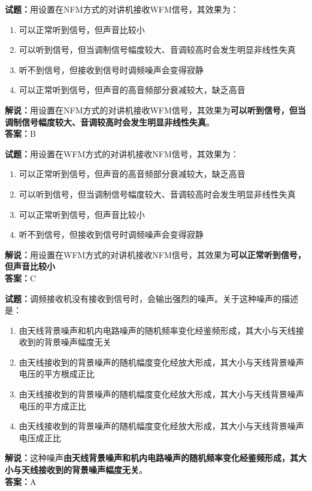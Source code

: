 \documentclass{ctexbook}
\begin{document}
\bigskip


\noindent\textbf{试题：}用设置在NFM方式的对讲机接收WFM信号，其效果为：
\begin{enumerate}[leftmargin=3em]
\item 可以正常听到信号，但声音比较小
\item 可以听到信号，但当调制信号幅度较大、音调较高时会发生明显非线性失真
\item 听不到信号，但接收到信号时调频噪声会变得寂静
\item 可以正常听到信号，但声音的高音频部分衰减较大，缺乏高音
\end{enumerate}
\noindent\textbf{解说：}用设置在NFM方式的对讲机接收WFM信号，其效果为\textbf{可以听到信号，但当调制信号幅度较大、音调较高时会发生明显非线性失真}。\\\noindent\textbf{答案：}B



\bigskip


\noindent\textbf{试题：}用设置在WFM方式的对讲机接收NFM信号，其效果为：
\begin{enumerate}[leftmargin=3em]
\item 可以正常听到信号，但声音的高音频部分衰减较大，缺乏高音
\item 可以听到信号，但当调制信号幅度较大、音调较高时会发生明显非线性失真
\item 可以正常听到信号，但声音比较小
\item 听不到信号，但接收到信号时调频噪声会变得寂静
\end{enumerate}
\noindent\textbf{解说：}用设置在WFM方式的对讲机接收NFM信号，其效果为\textbf{可以正常听到信号，但声音比较小}\\\noindent\textbf{答案：}C



\bigskip


\noindent\textbf{试题：}调频接收机没有接收到信号时，会输出强烈的噪声。关于这种噪声的描述是：
\begin{enumerate}[leftmargin=3em]
\item 由天线背景噪声和机内电路噪声的随机频率变化经鉴频形成，其大小与天线接收到的背景噪声幅度无关
\item 由天线接收到的背景噪声的随机幅度变化经放大形成，其大小与天线背景噪声电压的平方根成正比
\item 由天线接收到的背景噪声的随机幅度变化经放大形成，其大小与天线背景噪声电压的平方成正比
\item 由天线接收到的背景噪声的随机幅度变化经放大形成，其大小与天线背景噪声电压成正比
\end{enumerate}
\noindent\textbf{解说：}这种噪声\textbf{由天线背景噪声和机内电路噪声的随机频率变化经鉴频形成，其大小与天线接收到的背景噪声幅度无关}。\\\noindent\textbf{答案：}A
\end{document}
